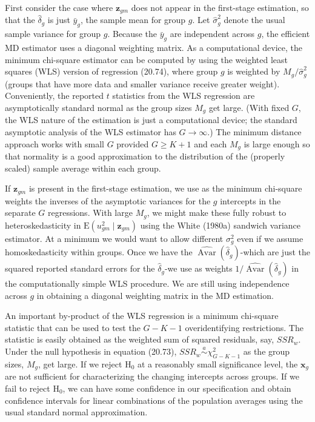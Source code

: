 \documentclass[10pt]{article}
\begin{document}
First consider the case where $\mathbf{z}_{g m}$ does not appear in the first-stage estimation, so that the $\hat{\delta}_{g}$ is just $\bar{y}_{g}$, the sample mean for group $g$. Let $\hat{\sigma}_{g}^{2}$ denote the usual sample variance for group $g$. Because the $\bar{y}_{g}$ are independent across $g$, the efficient MD estimator uses a diagonal weighting matrix. As a computational device, the minimum chi-square estimator can be computed by using the weighted least squares (WLS) version of regression (20.74), where group $g$ is weighted by $M_{g} / \hat{\sigma}_{g}^{2}$ (groups that have more data and smaller variance receive greater weight). Conveniently, the reported $t$ statistics from the WLS regression are asymptotically standard normal as the group sizes $M_{g}$ get large. (With fixed $G$, the WLS nature of the estimation is just a computational device; the standard asymptotic analysis of the WLS estimator has $G \rightarrow \infty$.) The minimum distance approach works with small $G$ provided $G \geq K+1$ and each $M_{g}$ is large enough so that normality is a good approximation to the distribution of the (properly scaled) sample average within each group.

If $\mathbf{z}_{g m}$ is present in the first-stage estimation, we use as the minimum chi-square weights the inverses of the asymptotic variances for the $g$ intercepts in the separate $G$ regressions. With large $M_{g}$, we might make these fully robust to heteroskedasticity in $\mathrm{E}\left(u_{g m}^{2} \mid \mathbf{z}_{g m}\right)$ using the White (1980a) sandwich variance estimator. At a minimum we would want to allow different $\sigma_{g}^{2}$ even if we assume homoskedasticity within groups. Once we have the $\widehat{\operatorname{Avar}}\left(\hat{\delta}_{g}\right)$-which are just the squared reported standard errors for the $\hat{\delta}_{g}$-we use as weights $1 / \widehat{\operatorname{Avar}}\left(\hat{\delta}_{g}\right)$ in the computationally simple WLS procedure. We are still using independence across $g$ in obtaining a diagonal weighting matrix in the MD estimation.

An important by-product of the WLS regression is a minimum chi-square statistic that can be used to test the $G-K-1$ overidentifying restrictions. The statistic is easily obtained as the weighted sum of squared residuals, say, $S S R_{w}$. Under the null hypothesis in equation (20.73), $S S R_{w} \stackrel{a}{\sim} \chi_{G-K-1}^{2}$ as the group sizes, $M_{g}$, get large. If we reject $\mathrm{H}_{0}$ at a reasonably small significance level, the $\mathbf{x}_{g}$ are not sufficient for characterizing the changing intercepts across groups. If we fail to reject $\mathrm{H}_{0}$, we can have some confidence in our specification and obtain confidence intervals for linear combinations of the population averages using the usual standard normal approximation.
\end{document}

